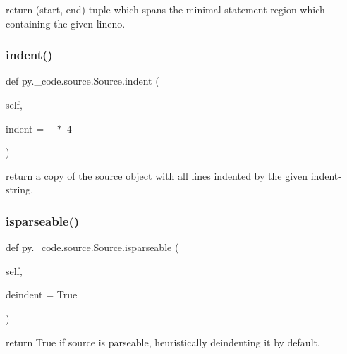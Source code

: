 \begin{DoxyVerb}return (start, end) tuple which spans the minimal
    statement region which containing the given lineno.
\end{DoxyVerb}
 \mbox{\label{classpy_1_1__code_1_1source_1_1_source_ae22bab7210f429aa4bd5dcc862169673}} 
\subsubsection{\texorpdfstring{indent()}{indent()}}
{\footnotesize\ttfamily def py.\+\_\+code.\+source.\+Source.\+indent (\begin{DoxyParamCaption}\item[{}]{self,  }\item[{}]{indent = {\ttfamily \textquotesingle{}~\textquotesingle{}~$\ast$~4} }\end{DoxyParamCaption})}

\begin{DoxyVerb}return a copy of the source object with
    all lines indented by the given indent-string.
\end{DoxyVerb}
 \mbox{\label{classpy_1_1__code_1_1source_1_1_source_a0512b77cc19bbbf387c55eafe89b39bf}} 
\subsubsection{\texorpdfstring{isparseable()}{isparseable()}}
{\footnotesize\ttfamily def py.\+\_\+code.\+source.\+Source.\+isparseable (\begin{DoxyParamCaption}\item[{}]{self,  }\item[{}]{deindent = {\ttfamily True} }\end{DoxyParamCaption})}

\begin{DoxyVerb}return True if source is parseable, heuristically
    deindenting it by default.
\end{DoxyVerb}
 \mbox{\label{classpy_1_1__code_1_1source_1_1_source_aa8a2ff562a48539bf3e57203b0e4373a}} 
